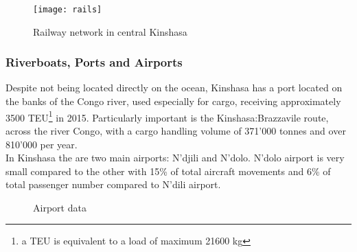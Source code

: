 \documentclass{article}
\begin{document}
\begin{figure}[H]
\centering
\texttt{[image: rails]}
\caption{Railway network in central Kinshasa \cite{ORM}}
\end{figure}
\subsubsection{Riverboats, Ports and Airports}
Despite not being located directly on the ocean, Kinshasa has a port located on the banks of the Congo river, used especially for cargo, receiving approximately 3500 TEU\footnote{a TEU is equivalent to a load of maximum 21600 kg} in 2015.
Particularly important is the Kinshasa:Brazzavile route, across the river Congo, with a cargo handling volume of 371'000 tonnes and over 810'000 per year.\\
In Kinshasa the are two main airports: N'djili and N'dolo. N'dolo airport is very small compared to the other with 15\% of total aircraft movements and 6\% of total passenger number compared to N'dili airport.
\begin{figure}[H]
\centering
{}
\qquad
{}
\caption{Airport data \cite{air}}
\end{figure}
\end{document}
